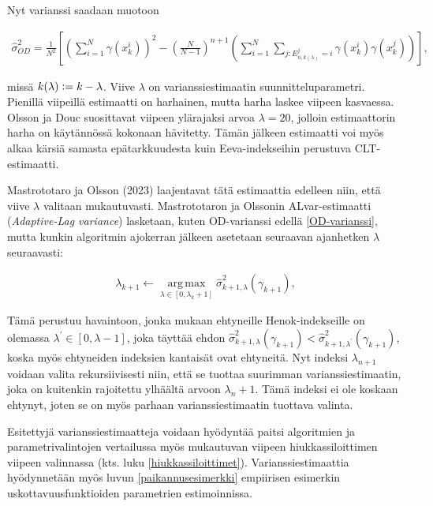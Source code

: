 \documentclass[
  12pt,
  a4paper, twoside]{book}
\begin{document}
Nyt varianssi saadaan muotoon

\begin{align}\label{OD-varianssi}
\hat{\sigma}^2_{OD} = \frac{1}{N^2} \left[ (\sum_{i=1}^N \gamma(x_k^i))^2 - (\frac{N}{N-1})^{n+1} ( \sum_{i=1}^N \sum_{j:E_{n,k(\lambda)}^j=i} \gamma(x_k^i) \gamma(x_k^j)) \right]
,\end{align}

missä \(k(\lambda) \vcentcolon= k-\lambda\). Viive \(\lambda\) on varianssiestimaatin suunnitteluparametri. Pienillä viipeillä estimaatti on harhainen, mutta harha laskee viipeen kasvaessa. Olsson ja Douc suosittavat viipeen ylärajaksi arvoa \(\lambda=20\), jolloin estimaattorin harha on käytännössä kokonaan hävitetty. Tämän jälkeen estimaatti voi myös alkaa kärsiä samasta epätarkkuudesta kuin Eeva-indekseihin perustuva CLT-estimaatti.

Mastrototaro ja Olsson (2023) \citep{Mastrototaro-2023} laajentavat tätä estimaattia edelleen niin, että viive \(\lambda\) valitaan mukautuvasti. Mastrototaron ja Olssonin ALvar-estimaatti (\emph{Adaptive-Lag variance}) lasketaan, kuten OD-varianssi edellä \ref{OD-varianssi}, mutta kunkin algoritmin ajokerran jälkeen asetetaan seuraavan ajanhetken \(\lambda\) seuraavasti:

\begin{align}\label{ALvar-lambda}
\lambda_{k+1} \leftarrow \operatorname*{arg\,max}_{\lambda \in [0, \lambda_k + 1]} \hat{\sigma}^2_{k+1,\lambda} (\gamma_{k+1})
,\end{align}

Tämä perustuu havaintoon, jonka mukaan ehtyneille Henok-indekseille on olemassa \(\lambda^\prime \in [0, \lambda-1]\), joka täyttää ehdon \(\hat{\sigma}^2_{k+1,\lambda} (\gamma_{k+1}) < \hat{\sigma}^2_{k+1,\lambda^\prime} (\gamma_{k+1})\), koska myös ehtyneiden indeksien kantaisät ovat ehtyneitä. Nyt indeksi \(\lambda_{n+1}\) voidaan valita rekursiivisesti niin, että se tuottaa suurimman varianssiestimaatin, joka on kuitenkin rajoitettu ylhäältä arvoon \(\lambda_n+1\). Tämä indeksi ei ole koskaan ehtynyt, joten se on myös parhaan varianssiestimaatin tuottava valinta.

Esitettyjä varianssiestimaatteja voidaan hyödyntää paitsi algoritmien ja parametrivalintojen vertailussa myös mukautuvan viipeen hiukkassiloittimen viipeen valinnassa (kts. luku \ref{hiukkassiloittimet}). Varianssiestimaattia hyödynnetään myös luvun \ref{paikannusesimerkki} empiirisen esimerkin uskottavuusfunktioiden parametrien estimoinnissa.
\end{document}
